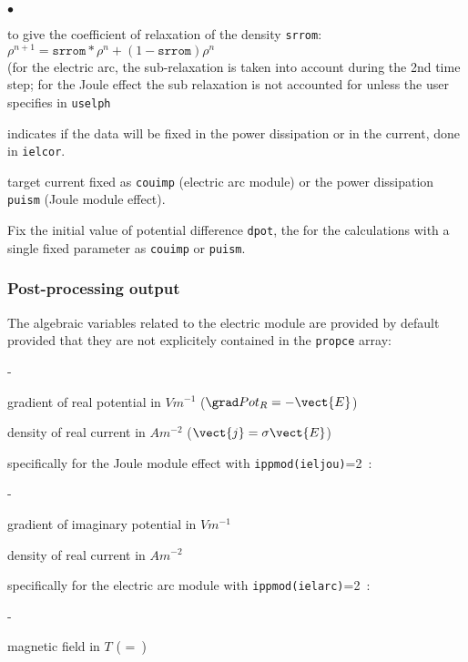 {{\begin{list}{$\bullet$}{}
       \item to give the coefficient of relaxation of the density \texttt{srrom}:\\
$\rho^{n+1}=\texttt{srrom}*\rho^{n}+(1-\texttt{srrom})\rho^{n}$\\
(for the electric arc, the sub-relaxation is taken into account during the 2nd time
 step; for the Joule effect the sub relaxation is not accounted for unless the user
 specifies in \texttt{uselph}

       \item indicates if the data will be fixed in the power dissipation or
 in the current, done in \texttt{ielcor}.
       \item target current fixed as \texttt{couimp} (electric arc module)
 or the power dissipation \texttt{puism} (Joule module effect).
       \item Fix the initial value of potential difference \texttt{dpot},
 the for the calculations with a single fixed parameter as \texttt{couimp}
 or \texttt{puism}.

\end{list}

\subsubsection[{\em EnSight} output]
{Post-processing output}

The algebraic variables related to the electric module are provided by default provided
 that they are not explicitely contained in the \texttt{propce} array:
\begin{list}{-}{}
\item gradient of real potential in $V m^{-1}$ ($\grad Pot_R = -\vect{E}$)
\item density of real current in $A m^{-2}$  ($\vect{j}=\sigma \vect{E}$)
\end{list}
specifically for the Joule module effect with \texttt{ippmod(ieljou)}=2~:
\begin{list}{-}{}
\item gradient of imaginary potential in $V m^{-1}$
\item density of real current in $A m^{-2}$
\end{list}
specifically for the electric arc module with \texttt{ippmod(ielarc)}=2~:
\begin{list}{-}{}
\item magnetic field in $T$ ( = \,)
\end{list}

}}
